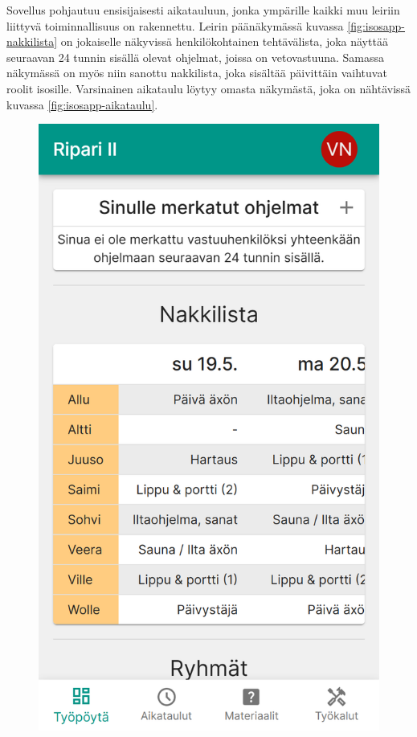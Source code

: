 Sovellus pohjautuu ensisijaisesti aikatauluun, jonka ympärille kaikki muu
leiriin liittyvä toiminnallisuus on rakennettu. Leirin päänäkymässä kuvassa
\ref{fig:isosapp-nakkilista} on jokaiselle näkyvissä henkilökohtainen
tehtävälista, joka näyttää seuraavan 24 tunnin sisällä olevat ohjelmat, joissa
on vetovastuuna. Samassa näkymässä on myös niin sanottu nakkilista, joka
sisältää päivittäin vaihtuvat roolit isosille. Varsinainen aikataulu löytyy
omasta näkymästä, joka on nähtävissä kuvassa \ref{fig:isosapp-aikataulu}.

\begin{figure}[h!]
    \centering
    \begin{minipage}[b]{.3\textwidth}
        \includegraphics[width=\textwidth]{figures/isosapp-nakkilista.png}

\end{minipage}
\end{figure}
